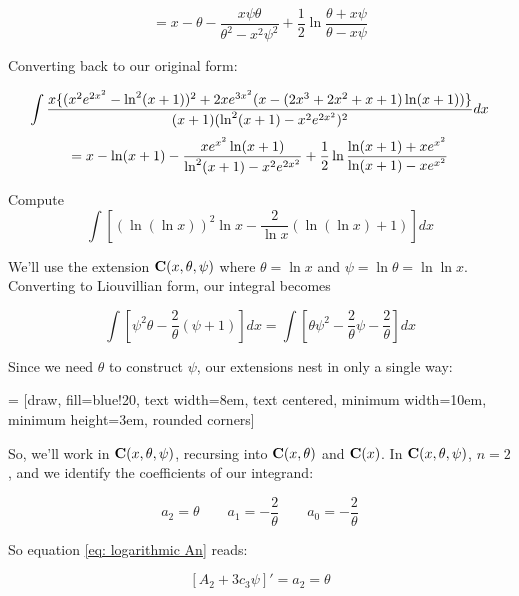 $$ = x - \theta -\frac{x \psi \theta}{\theta^2 - x^2 \psi^2} + \frac{1}{2}\ln\frac{\theta + x\psi}{\theta - x \psi}$$

Converting back to our original form:

$$\int{{x\{(x^2e^{2x^2}-\ln^2(x+1))^2+2xe^{3x^2}(x-(2x^3+2x^2+x+1)\ln(x+1))\}}\over{(x+1)(\ln^2(x+1) - x^2e^{2x^2})^2}} dx$$
$$= x - \ln(x+1) - {x e^{x^2}\ln(x+1)\over{\ln^2(x+1)-x^2 e^{2x^2}}}
+ {1\over2}\ln\frac{\ln(x+1) + x e^{x^2}}{\ln(x+1) - x e^{x^2}}$$

\endexample

\vfill\eject

\example
Compute
$$\int \left[ (\ln(\ln x))^2 \ln x - \frac{2}{\ln x}(\ln(\ln x) +1) \right] dx$$

We'll use the extension ${\bf C}(x,\theta,\psi)$
where $\theta = \ln x$ and $\psi = \ln \theta = \ln \ln x$.
Converting to Liouvillian form, our integral becomes

$$\int \left[ \psi^2 \theta - \frac{2}{\theta}(\psi+1) \right] dx
= \int \left[ \theta \psi^2 - \frac{2}{\theta}\psi - \frac{2}{\theta} \right] dx$$

Since we need $\theta$ to construct $\psi$, our extensions nest
in only a single way:

 = [draw, fill=blue!20, text width=8em, text centered,
  minimum width=10em, minimum height=3em, rounded corners]

\begin{center}
\end{center}

So, we'll work in ${\bf C}(x,\theta,\psi)$, recursing into
${\bf C}(x,\theta)$ and ${\bf C}(x)$.  In ${\bf C}(x,\theta,\psi)$,
$n=2$, and we identify the coefficients of our integrand:

$$a_2 = \theta \qquad a_1 = - \frac{2}{\theta} \qquad a_0 = - \frac{2}{\theta}$$

So equation \eqref{eq: logarithmic An} reads:

$$\left[ A_2 + 3 c_3 \psi \right]' = a_2 = \theta$$

